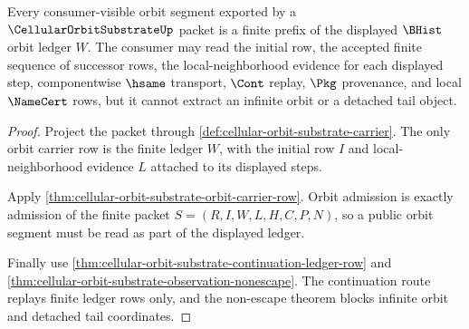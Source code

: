 \begin{theorem}
\label{thm:cellular-orbit-substrate-orbit-prefix-obligation}
Every consumer-visible orbit segment exported by a $\CellularOrbitSubstrateUp$ packet is a finite prefix of the displayed $\BHist$ orbit ledger $W$. The consumer may read the initial row, the accepted finite sequence of successor rows, the local-neighborhood evidence for each displayed step, componentwise $\hsame$ transport, $\Cont$ replay, $\Pkg$ provenance, and local $\NameCert$ rows, but it cannot extract an infinite orbit or a detached tail object.
\end{theorem}
\begin{proof}
Project the packet through \autoref{def:cellular-orbit-substrate-carrier}. The only orbit carrier row is the finite ledger $W$, with the initial row $I$ and local-neighborhood evidence $L$ attached to its displayed steps.

Apply \autoref{thm:cellular-orbit-substrate-orbit-carrier-row}. Orbit admission is exactly admission of the finite packet $S=(R,I,W,L,H,C,P,N)$, so a public orbit segment must be read as part of the displayed ledger.

Finally use \autoref{thm:cellular-orbit-substrate-continuation-ledger-row} and \autoref{thm:cellular-orbit-substrate-observation-nonescape}. The continuation route replays finite ledger rows only, and the non-escape theorem blocks infinite orbit and detached tail coordinates.
\end{proof}

